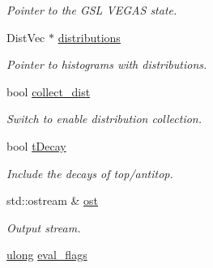 \begin{DoxyCompactItemize}
\begin{DoxyCompactList}\small\item\em Pointer to the G\+S\+L V\+E\+G\+A\+S state. \end{DoxyCompactList}\item 
\hypertarget{classintegrand__par_acd322d49688d798e5f71eb9ea63a4d46}{}Dist\+Vec $\ast$ \hyperlink{classintegrand__par_acd322d49688d798e5f71eb9ea63a4d46}{distributions}\label{classintegrand__par_acd322d49688d798e5f71eb9ea63a4d46}

\begin{DoxyCompactList}\small\item\em Pointer to histograms with distributions. \end{DoxyCompactList}\item 
\hypertarget{classintegrand__par_a2227f484c28e54b55769b2fe6911a782}{}bool \hyperlink{classintegrand__par_a2227f484c28e54b55769b2fe6911a782}{collect\+\_\+dist}\label{classintegrand__par_a2227f484c28e54b55769b2fe6911a782}

\begin{DoxyCompactList}\small\item\em Switch to enable distribution collection. \end{DoxyCompactList}\item 
\hypertarget{classintegrand__par_a725bfa73c797c38c5575594d0ff53eb6}{}bool \hyperlink{classintegrand__par_a725bfa73c797c38c5575594d0ff53eb6}{t\+Decay}\label{classintegrand__par_a725bfa73c797c38c5575594d0ff53eb6}

\begin{DoxyCompactList}\small\item\em Include the decays of top/antitop. \end{DoxyCompactList}\item 
\hypertarget{classintegrand__par_ab817e73577da97cd660ad01761521d3b}{}std\+::ostream \& \hyperlink{classintegrand__par_ab817e73577da97cd660ad01761521d3b}{ost}\label{classintegrand__par_ab817e73577da97cd660ad01761521d3b}

\begin{DoxyCompactList}\small\item\em Output stream. \end{DoxyCompactList}\item 
\hypertarget{classintegrand__par_adb701c9d21e3b412032dca85ebcde090}{}\hyperlink{Global_8h_a1398ea0e48e059bf4db2f4bcd7eb31fa}{ulong} \hyperlink{classintegrand__par_adb701c9d21e3b412032dca85ebcde090}{eval\+\_\+flags}\label{classintegrand__par_adb701c9d21e3b412032dca85ebcde090}


\end{DoxyCompactItemize}
